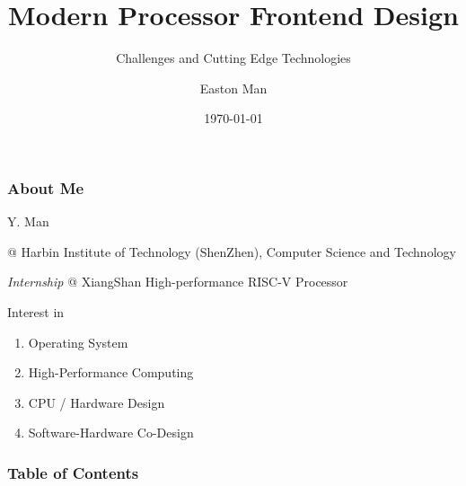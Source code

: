 \documentclass[aspectratio=169]{beamer}
\title{Modern Processor Frontend Design}
\subtitle{Challenges and Cutting Edge Technologies}
\author{Easton Man}
\institute[HITSZ]{Harbin Institute of Technology (ShenZhen)}
\date{\today}
\begin{document}
\frame{\titlepage}

\begin{frame}
    \frametitle{About Me}

    Y. Man

    @ Harbin Institute of Technology (ShenZhen), Computer Science and Technology

    \emph{Internship} @ XiangShan High-performance RISC-V Processor

    \vspace{2em}

    Interest in
    \begin{enumerate}
        \item Operating System
        \item High-Performance Computing
        \item CPU / Hardware Design
        \item Software-Hardware Co-Design
    \end{enumerate}

\end{frame}

\begin{frame}
    \frametitle{Table of Contents}
    \tableofcontents
\end{frame}


\end{document}
